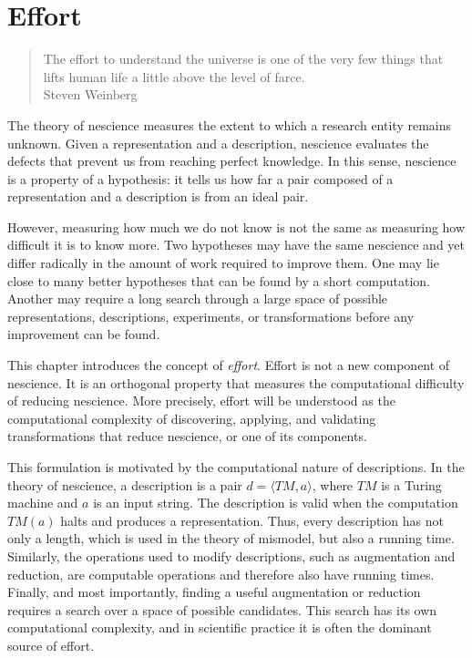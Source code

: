 %
%



\chapter{Effort}
\label{chap:Effort}

\begin{quote}
\begin{flushright}
The effort to understand the universe is one of the very few things that lifts human life a little above the level of farce.\\
Steven Weinberg
\end{flushright}
\end{quote}

The theory of nescience measures the extent to which a research entity remains unknown. Given a representation and a description, nescience evaluates the defects that prevent us from reaching perfect knowledge. In this sense, nescience is a property of a hypothesis: it tells us how far a pair composed of a representation and a description is from an ideal pair.

However, measuring how much we do not know is not the same as measuring how difficult it is to know more. Two hypotheses may have the same nescience and yet differ radically in the amount of work required to improve them. One may lie close to many better hypotheses that can be found by a short computation. Another may require a long search through a large space of possible representations, descriptions, experiments, or transformations before any improvement can be found.

This chapter introduces the concept of \emph{effort}. Effort is not a new component of nescience. It is an orthogonal property that measures the computational difficulty of reducing nescience. More precisely, effort will be understood as the computational complexity of discovering, applying, and validating transformations that reduce nescience, or one of its components.

This formulation is motivated by the computational nature of descriptions. In the theory of nescience, a description is a pair $d=\langle T M,a\rangle$, where $T M$ is a Turing machine and $a$ is an input string. The description is valid when the computation $T M(a)$ halts and produces a representation. Thus, every description has not only a length, which is used in the theory of mismodel, but also a running time. Similarly, the operations used to modify descriptions, such as augmentation and reduction, are computable operations and therefore also have running times. Finally, and most importantly, finding a useful augmentation or reduction requires a search over a space of possible candidates. This search has its own computational complexity, and in scientific practice it is often the dominant source of effort.

